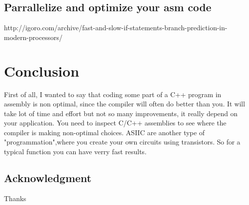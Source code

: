 \documentclass[runningheads,a4paper]{llncs}
\begin{document}
	\subsection{Parrallelize and optimize your asm code}
	\label{sec:method}
	http://igoro.com/archive/fast-and-slow-if-statements-branch-prediction-in-modern-processors/
	\section{Conclusion}
	\label{sec:conclusion}
	First of all, I wanted to say that coding some part of a C++ program in assembly is non optimal, since the compiler will often do better than you. It will take lot of time and effort but not so many improvements, it really depend on your application. You need to inspect C/C++ assemblies to see where the compiler is making non-optimal choices.
	ASIIC are another type of "programmation",where you create your own circuits using transistors. So for a typical function you can have verry fast results.
	\subsection*{Acknowledgment}
	Thanks
	
	{\small
		
		
	}
	
\end{document}
